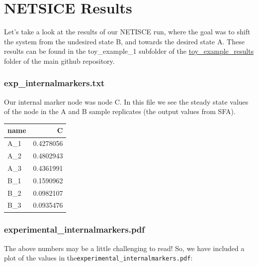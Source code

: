 \documentclass[
]{book}
\begin{document}
\hypertarget{netsice-results}{%
\section{NETSICE Results}\label{netsice-results}}

Let's take a look at the results of our NETISCE run, where the goal was to shift the system from the undesired state B, and towards the desired state A. These results can be found in the toy\_example\_1 subfolder of the \href{https://github.com/VeraLiconaResearchGroup/Netisce/tree/main/toy_example_results}{toy\_example\_results} folder of the main github repository.

\hypertarget{section-id}{%
\subsubsection*{exp\_internalmarkers.txt}\label{section-id}}

Our internal marker node was node C. In this file we see the steady state values of the node in the A and B sample replicates (the output values from SFA).

\begin{tabular}{l|r}
\hline
name & C\\
\hline
A\_1 & 0.4278056\\
\hline
A\_2 & 0.4802943\\
\hline
A\_3 & 0.4361991\\
\hline
B\_1 & 0.1590962\\
\hline
B\_2 & 0.0982107\\
\hline
B\_3 & 0.0935476\\
\hline
\end{tabular}

\hypertarget{section-id}{%
\subsubsection*{experimental\_internalmarkers.pdf}\label{section-id}}

The above numbers may be a little challenging to read! So, we have included a plot of the values in the\texttt{experimental\_internalmarkers.pdf}:
\end{document}
